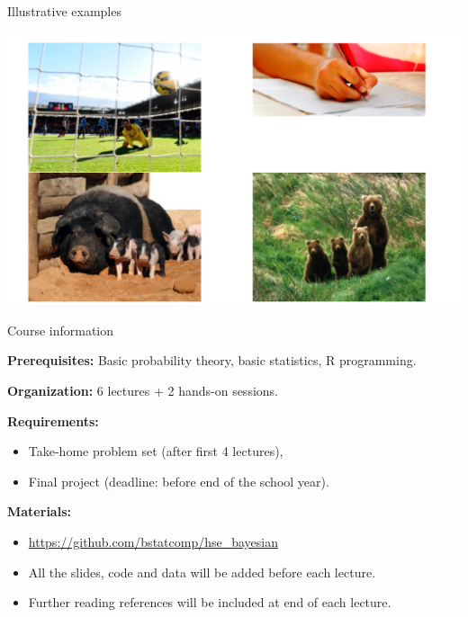 \begin{frame}{Illustrative examples}

\bigskip

\begin{center}
\includegraphics[width=0.80\linewidth]{../LectureAssets/L00/IllustrativeExamples}

\end{center}

\bigskip

\end{frame}

\begin{frame}[fragile]{Course information}

\textbf{Prerequisites:} Basic probability theory, basic statistics, R programming.

\bigskip

\textbf{Organization:} 6 lectures + 2 hands-on sessions.

\bigskip

\textbf{Requirements:}

\begin{itemize}
\item Take-home problem set (after first 4 lectures),
\item Final project (deadline: before end of the school year).
\end{itemize}

\bigskip

\textbf{Materials:}

\begin{itemize}
\item \url{https://github.com/bstatcomp/hse_bayesian}
\item All the slides, code and data will be added before each lecture.
\item Further reading references will be included at end of each lecture.
\end{itemize}

\bigskip

\end{frame}

